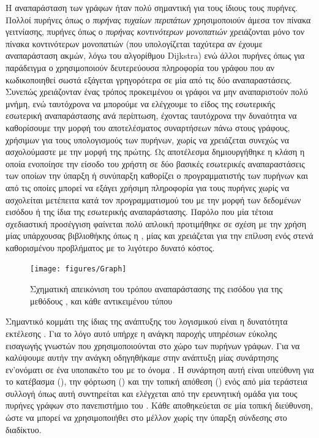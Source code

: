 Η αναπαράσταση των γράφων ήταν πολύ σημαντική για τους ίδιους τους πυρήνες.
Πολλοί πυρήνες όπως ο \textit{πυρήνας τυχαίων περιπάτων} χρησιμοποιούν άμεσα τον πίνακα γειτνίασης, πυρήνες όπως ο \textit{πυρήνας κοντινότερων μονοπατιών} χρειάζονται μόνο τον πίνακα κοντινότερων μονοπατιών (που υπολογίζεται ταχύτερα αν έχουμε αναπαράσταση ακμών, λόγω του αλγορίθμου Dijkstra) ενώ άλλοι πυρήνες όπως για παράδειγμα ο  χρησιμοποιούν δευτερεύουσα πληροφορία του γράφου που αν κωδικοποιηθεί σωστά εξάγεται γρηγορότερα σε μία από τις δύο αναπαραστάσεις.
Συνεπώς χρειάζονταν ένας τρόπος προκειμένου οι γράφοι να μην αναπαριστούν πολύ μνήμη, ενώ ταυτόχρονα να μπορούμε να ελέγχουμε το είδος της εσωτερικής εσωτερική αναπαράστασης ανά περίπτωση, έχοντας ταυτόχρονα την δυναότητα να καθορίσουμε την μορφή του αποτελέσματος συναρτήσεων πάνω στους γράφους, χρήσιμων για τους υπολογισμούς των πυρήνων, χωρίς να χρειάζεται συνεχώς να ασχολούμαστε με την μορφή της πρώτης.
Ως αποτέλεσμα δημιουργήθηκε η κλάση  η οποία ενοποίησε την είσοδο του χρήστη σε δύο βασικές εσωτερικές αναπαραστάσεις των οποίων την ύπαρξη ή συνύπαρξη καθορίζει ο προγραμματιστής των πυρήνων και από τις οποίες μπορεί να εξάγει χρήσιμη πληροφορία για τους πυρήνες χωρίς να ασχολείται μετέπειτα κατά τον προγραμματισμού του με την μορφή των δεδομένων εισόδου ή της ίδια της εσωτερικής αναπαράστασης.
Παρόλο που μία τέτοια σχεδιαστική προσέγγιση φαίνεται πολύ απλοική προτιμήθηκε σε σχέση με την χρήση μίας υπάρχουσας βιβλιοθήκης όπως η , μίας και χρειάζεται για την επίλυση ενός στενά καθορισμένου προβλήματος με το λιγότερο δυνατό κόστος.

\begin{figure}[]
    \centering
    \texttt{[image: figures/Graph]}
    \caption{Σχηματική απεικόνιση του τρόπου αναπαράστασης της εισόδου για της μεθόδους \texttt{}, \texttt{} και \texttt{} κάθε αντικειμένου τύπου }
    \label{fig:graph}
\end{figure}

Σημαντικό κομμάτι της ίδιας της ανάπτυξης του λογισμικού είναι η δυνατότητα εκτέλεσης .
Για το λόγο αυτό υπήρχε η ανάγκη παροχής υπηρέσιων εύκολης εισαγωγής γνωστών  που χρησιμοποιούνται στο χώρο των πυρήνων γράφων.
Για να καλύψουμε αυτήν την ανάγκη οδηγηθήκαμε στην ανάπτυξη μίας συνάρτησης εν'ονόματι  σε ένα υποπακέτο του  με το όνομα .
Η συνάρτηση αυτή είναι υπεύθυνη για το κατέβασμα (), την φόρτωση () και την τοπική απόθεση () ενός  από μία τεράστεια συλλογή όπως αυτή συντηρείται και ελέγχεται από την ερευνητική ομάδα για τους πυρήνες γράφων στο πανεπιστήμιο του  \cite{KKMMN2016}. Κάθε  αποθηκεύεται σε μία τοπική διεύθυνση, ώστε να μπορεί να χρησιμοποιήθει στο μέλλον χωρίς την ύπαρξη σύνδεσης στο διαδίκτυο.

